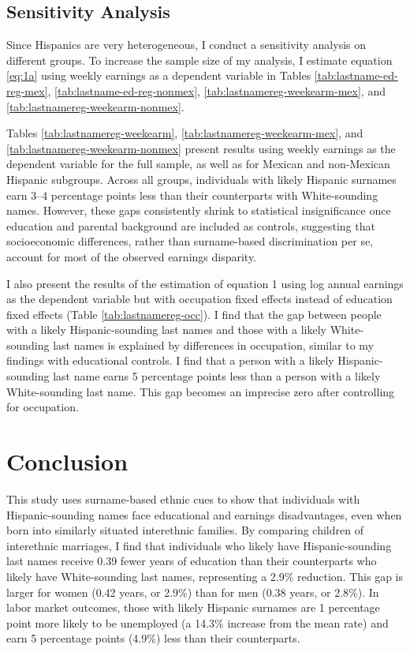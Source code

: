 \subsection{Sensitivity Analysis}

Since Hispanics are very heterogeneous, I conduct a sensitivity analysis on different groups. To increase the sample size of my analysis, I estimate equation \ref{eq:1a} using weekly earnings as a dependent variable in Tables \ref{tab:lastname-ed-reg-mex}, \ref{tab:lastname-ed-reg-nonmex}, \ref{tab:lastnamereg-weekearm-mex}, and \ref{tab:lastnamereg-weekearm-nonmex}. 

Tables \ref{tab:lastnamereg-weekearm}, \ref{tab:lastnamereg-weekearm-mex}, and \ref{tab:lastnamereg-weekearm-nonmex} present results using weekly earnings as the dependent variable for the full sample, as well as for Mexican and non-Mexican Hispanic subgroups. Across all groups, individuals with likely Hispanic surnames earn 3–4 percentage points less than their counterparts with White-sounding names. However, these gaps consistently shrink to statistical insignificance once education and parental background are included as controls, suggesting that socioeconomic differences, rather than surname-based discrimination per se, account for most of the observed earnings disparity.

I also present the results of the estimation of equation 1 using log annual earnings as the dependent variable but with occupation fixed effects instead of education fixed effects (Table \ref{tab:lastnamereg-occ}). I find that the gap between people with a likely Hispanic-sounding last names and those with a likely White-sounding last names is explained by differences in occupation, similar to my findings with educational controls. I find that a person with a likely Hispanic-sounding last name earns 5 percentage points less than a person with a likely White-sounding last name. This gap becomes an imprecise zero after controlling for occupation.

\section{Conclusion}\label{sec:con1}

This study uses surname-based ethnic cues to show that individuals with Hispanic-sounding names face educational and earnings disadvantages, even when born into similarly situated interethnic families. By comparing children of interethnic marriages, I find that individuals who likely have Hispanic-sounding last names receive 0.39 fewer years of education than their counterparts who likely have White-sounding last names, representing a 2.9\% reduction. This gap is larger for women (0.42 years, or 2.9\%) than for men (0.38 years, or 2.8\%). In labor market outcomes, those with likely Hispanic surnames are 1 percentage point more likely to be unemployed (a 14.3\% increase from the mean rate) and earn 5 percentage points (4.9\%) less than their counterparts.

